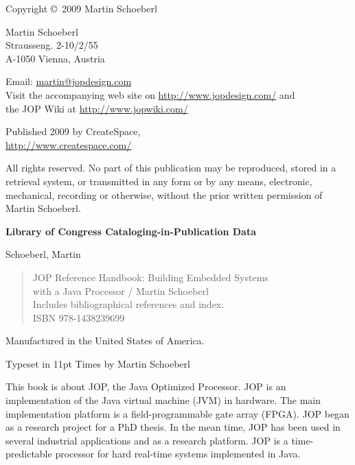 \thispagestyle{empty}
\begin{flushleft}
{\small

Copyright \copyright \ 2009 Martin Schoeberl
\medskip

Martin Schoeberl\\
Strausseng. 2-10/2/55\\
A-1050 Vienna, Austria\\
\medskip

Email: \url{martin@jopdesign.com}\\
Visit the accompanying web site on \url{http://www.jopdesign.com/}
and\\
the JOP Wiki at \url{http://www.jopwiki.com/}
\medskip

Published 2009 by CreateSpace,\\
\url{http://www.createspace.com/}



\medskip


All rights reserved. No part of this publication may be reproduced,
stored in a retrieval system, or transmitted in any form or by any
means, electronic, mechanical, recording or otherwise, without the
prior written permission of Martin Schoeberl.
\medskip


\textbf{Library of Congress Cataloging-in-Publication Data}
\medskip

Schoeberl, Martin
\begin{quote}
    JOP Reference Handbook: Building Embedded Systems\\
    with a Java Processor / Martin Schoeberl\\
    Includes bibliographical references and index.\\
    ISBN 978-1438239699
\end{quote}

\bigskip


Manufactured in the United States of America.

Typeset in 11pt Times by Martin Schoeberl}
\end{flushleft}




This book is about JOP, the Java Optimized Processor. JOP is an
implementation of the Java virtual machine (JVM) in hardware. The
main implementation platform is a field-programmable gate array
(FPGA). JOP began as a research project for a PhD thesis. In the mean
time, JOP has been used in several industrial applications and as a
research platform. JOP is a time-predictable processor for hard
real-time systems implemented in Java.

